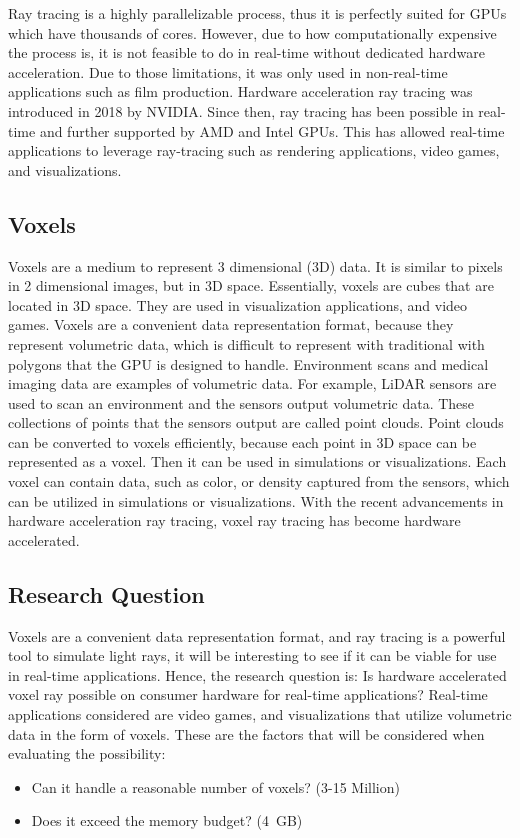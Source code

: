 \documentclass[12pt]{article}
\begin{document}
Ray tracing is a highly parallelizable process, thus it is perfectly suited for GPUs which have
thousands of cores. However, due to how computationally expensive the
process is, it is not feasible to do in real-time without dedicated hardware
acceleration. Due to those limitations, it was only used in non-real-time
applications such as film production. Hardware acceleration ray tracing was introduced in 2018 by NVIDIA.
Since then, ray tracing has been possible in real-time and further supported by AMD and
Intel GPUs. This has allowed real-time applications to leverage ray-tracing such as rendering
applications, video games, and visualizations.

\subsection{Voxels}

Voxels are a medium to represent 3 dimensional (3D) data. It is similar to pixels in 2 dimensional images,
but in 3D space. Essentially, voxels are cubes that are located in 3D space.
They are used in visualization applications, and video games.
Voxels are a convenient data representation format, because they represent
volumetric data, which is difficult to represent with traditional with polygons that the GPU is designed to handle.
Environment scans and medical imaging data are examples of volumetric data.
For example, LiDAR sensors are used to scan an environment and the sensors output volumetric data.
These collections of points that the sensors output are called point clouds.
Point clouds can be converted to voxels efficiently, because each point in 3D space can be represented as a voxel.
Then it can be used in simulations or visualizations.
Each voxel can contain data, such as color, or density captured from the sensors,
which can be utilized in simulations or visualizations. With the recent advancements in hardware acceleration
ray tracing, voxel ray tracing has become hardware accelerated.

\subsection{Research Question}

Voxels are a convenient data representation format, and ray tracing is a powerful tool to simulate light rays,
it will be interesting to see if it can be viable for use in real-time applications.
Hence, the research question is: Is hardware accelerated voxel ray possible on consumer hardware for real-time applications?
Real-time applications considered are video games, and visualizations that utilize volumetric data in the form of voxels.
These are the factors that will be considered when evaluating the possibility:
\begin{itemize}
    \itemsep0em
    \item Can it handle a reasonable number of voxels? (3-15 Million)
    \item Does it exceed the memory budget? (4 GB)
\end{itemize}
\end{document}
